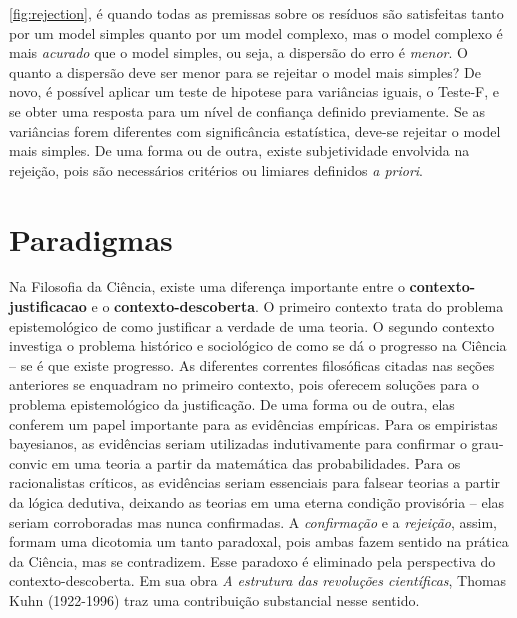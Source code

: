 \documentclass[./main.tex]{subfiles}
\begin{document}
\ref{fig:rejection}, é quando todas as premissas sobre os resíduos são satisfeitas tanto por um \gls{model} simples quanto por um \gls{model} complexo, mas o \gls{model} complexo é mais \textit{acurado} que o \gls{model} simples, ou seja, a dispersão do erro é \textit{menor}. O quanto a dispersão deve ser menor para se rejeitar o \gls{model} mais simples? De novo, é possível aplicar um teste de \gls{hipotese} para variâncias iguais, o Teste-F, e se obter uma resposta para um nível de confiança definido previamente. Se as variâncias forem diferentes com significância estatística, deve-se rejeitar o \gls{model} mais simples. De uma forma ou de outra, existe subjetividade envolvida na rejeição, pois são necessários critérios ou limiares definidos \textit{a priori}.

\section{Paradigmas} \label{sec:epis:kuhn}

\par Na Filosofia da Ciência, existe uma diferença importante entre o \textbf{\gls{contexto-justificacao}} e o \textbf{\gls{contexto-descoberta}}. O primeiro contexto trata do problema epistemológico de como justificar a verdade de uma \gls{teoria}. O segundo contexto investiga o problema histórico e sociológico de como se dá o progresso na Ciência – se é que existe progresso. As diferentes correntes filosóficas citadas nas seções anteriores se enquadram no primeiro contexto, pois oferecem soluções para o problema epistemológico da justificação. De uma forma ou de outra, elas conferem um papel importante para as evidências empíricas. Para os empiristas bayesianos, as evidências seriam utilizadas indutivamente para confirmar o \gls{grau-convic} em uma \gls{teoria} a partir da matemática das probabilidades. Para os racionalistas críticos, as evidências seriam essenciais para falsear teorias a partir da lógica dedutiva, deixando as teorias em uma eterna condição provisória – elas seriam corroboradas mas nunca confirmadas. A \textit{confirmação} e a \textit{rejeição}, assim, formam uma dicotomia um tanto paradoxal, pois ambas fazem sentido na prática da Ciência, mas se contradizem. Esse paradoxo é eliminado pela perspectiva do \gls{contexto-descoberta}. Em sua obra \textit{A estrutura das revoluções científicas}, Thomas Kuhn (1922-1996) traz uma contribuição substancial nesse sentido. 
\end{document}
